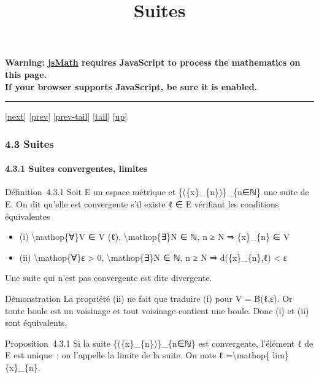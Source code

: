 \documentclass[]{article}
\title{Suites}
\author{}
\date{}
\begin{document}
\maketitle

\textbf{Warning: \href{http://www.math.union.edu/locate/jsMath}{jsMath}
requires JavaScript to process the mathematics on this page.\\ If your
browser supports JavaScript, be sure it is enabled.}

\begin{center}\rule{3in}{0.4pt}\end{center}

{[}\href{coursse21.html}{next}{]} {[}\href{coursse19.html}{prev}{]}
{[}\href{coursse19.html\#tailcoursse19.html}{prev-tail}{]}
{[}\hyperref[tailcoursse20.html]{tail}{]}
{[}\href{coursch5.html\#coursse20.html}{up}{]}

\subsubsection{4.3 Suites}

\paragraph{4.3.1 Suites convergentes, limites}

Définition~4.3.1 Soit E un espace métrique et
\{(\{x\}\_\{n\})\}\_\{n∈ℕ\} une suite de E. On dit qu'elle est
convergente s'il existe ℓ ∈ E vérifiant les conditions équivalentes

\begin{itemize}
\itemsep1pt\parskip0pt
\item
  (i) \textbackslash{}mathop\{∀\}V ∈ V (ℓ), \textbackslash{}mathop\{∃\}N
  ∈ ℕ, n ≥ N ⇒ \{x\}\_\{n\} ∈ V
\item
  (ii) \textbackslash{}mathop\{∀\}ε \textgreater{} 0,
  \textbackslash{}mathop\{∃\}N ∈ ℕ, n ≥ N ⇒ d(\{x\}\_\{n\},ℓ)
  \textless{} ε
\end{itemize}

Une suite qui n'est pas convergente est dite divergente.

Démonstration La propriété (ii) ne fait que traduire (i) pour V =
B(ℓ,ε). Or toute boule est un voisinage et tout voisinage contient une
boule. Donc (i) et (ii) sont équivalents.

Proposition~4.3.1 Si la suite \{(\{x\}\_\{n\})\}\_\{n∈ℕ\} est
convergente, l'élément ℓ de E est unique~; on l'appelle la limite de la
suite. On note ℓ =\textbackslash{}mathop\{ lim\}\{x\}\_\{n\}.
\end{document}
